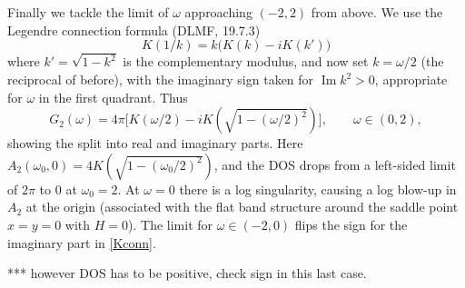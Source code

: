 \documentclass[11pt]{article}
\newcommand{\be}{\begin{equation}}
\newcommand{\ee}{\end{equation}}
\DeclareMathOperator{\im}{Im}
\newcommand{\om}{\omega}
\begin{document}
Finally we tackle the limit of $\om$ approaching $(-2,2)$ from above.
We use the Legendre connection formula (DLMF, 19.7.3)
\be
K(1/k) = k\big( K(k) - iK(k') \big)
\label{Kconn}
\ee
where $k'=\sqrt{1-k^2}$ is the complementary modulus, and now set $k=\om/2$
(the reciprocal of before),
with the imaginary sign taken for $\im k^2 > 0$, appropriate
for $\om$ in the first quadrant.
Thus
\[
G_2(\om) = 4\pi \bigl[ K(\om/2) -i K(\sqrt{1-(\om/2)^2}) \bigr],
\qquad \om \in (0,2),
\]
showing the split into real and imaginary parts.
Here $A_2(\om_0,0) = 4K(\sqrt{1-(\om_0/2)^2})$,
and the DOS drops from a left-sided limit of $2\pi$ to $0$ at $\om_0=2$.
At $\om=0$ there is a log singularity, causing a log blow-up
in $A_2$ at the origin (associated with the flat band structure
around the saddle point $x=y=0$ with $H=0$).
The limit for $\om \in (-2,0)$ flips the sign for the imaginary part in 
\eqref{Kconn}.

*** however DOS has to be positive, check sign in this last case.




\end{document}
